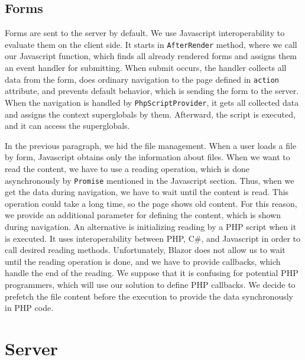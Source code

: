 \subsection{Forms}

Forms are sent to the server by default.
We use Javascript interoperability to evaluate them on the client side.
It starts in \texttt{AfterRender} method, where we call our Javascript function, which finds all already rendered forms and assigns them an event handler for submitting.
When submit occurs, the handler collects all data from the form, does ordinary navigation to the page defined in \texttt{action} attribute, and prevents default behavior, which is sending the form to the server.
When the navigation is handled by \texttt{PhpScriptProvider}, it gets all collected data and assigns the context superglobals by them.
Afterward, the script is executed, and it can access the superglobals.
\par
In the previous paragraph, we hid the file management.
When a user loads a file by form, Javascript obtains only the information about files. 
When we want to read the content, we have to use a reading operation, which is done asynchronously by \texttt{Promise} mentioned in the Javascript section.
Thus, when we get the data during navigation, we have to wait until the content is read.
This operation could take a long time, so the page shows old content.
For this reason, we provide an additional parameter for defining the content, which is shown during navigation.
An alternative is initializing reading by a PHP script when it is executed.
It uses interoperability between PHP, C\#, and Javascript in order to call desired reading methods.
Unfortunately, Blazor does not allow us to wait until the reading operation is done, and we have to provide callbacks, which handle the end of the reading.
We suppose that it is confusing for potential PHP programmers, which will use our solution to define PHP callbacks.
We decide to prefetch the file content before the execution to provide the data synchronously in PHP code.

\section{Server}

